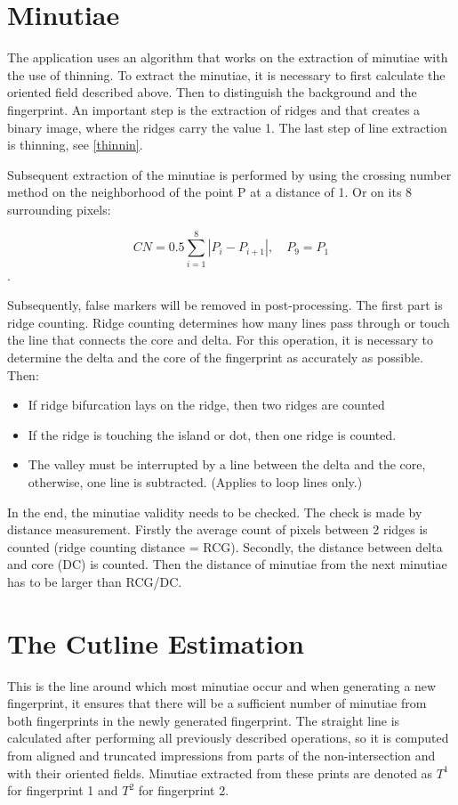 \section{Minutiae}
The application uses an algorithm that works on the extraction of minutiae with the use of thinning. To extract the minutiae, it is necessary to first calculate the oriented field described above. Then to distinguish the background and the fingerprint. An important step is the extraction of ridges and that creates a binary image, where the ridges carry the value 1. The last step of line extraction is thinning, see \ref{thinnin}.

Subsequent extraction of the minutiae is performed by using the crossing number method on the neighborhood of the point P at a distance of 1. Or on its 8 surrounding pixels: \cite{thinning}

\begin{equation}
    C N=0.5 \sum_{i=1}^{8}\left|P_{i}-P_{i+1}\right|, \quad P_{9}=P_{1}
\end{equation} .

Subsequently, false markers will be removed in post-processing. The first part is ridge counting. Ridge counting determines how many lines pass through or touch the line that connects the core and delta. For this operation, it is necessary to determine the delta and the core of the fingerprint as accurately as possible. Then: \cite{thinning}

\begin{itemize}
	\item If ridge bifurcation lays on the ridge, then two ridges are counted
	\item If the ridge is touching the island or dot, then one ridge is counted.
    \item The valley must be interrupted by a line between the delta and the core, otherwise, one line is subtracted. (Applies to loop lines only.)
\end{itemize}

In the end, the minutiae validity needs to be checked. The check is made by distance measurement. Firstly the average count of pixels between 2 ridges is counted (ridge counting distance = RCG). Secondly, the distance between delta and core (DC) is counted. Then the distance of minutiae from the next minutiae has to be larger than RCG/DC. \cite{thinning}

\section{The Cutline Estimation}
This is the line around which most minutiae occur and when generating a new fingerprint, it ensures that there will be a sufficient number of minutiae from both fingerprints in the newly generated fingerprint. The straight line is calculated after performing all previously described operations, so it is computed from aligned and truncated impressions from parts of the non-intersection and with their oriented fields. Minutiae extracted from these prints are denoted as $T^1$ for fingerprint 1 and $ T^2 $ for fingerprint 2. \cite{morphing_paper}


